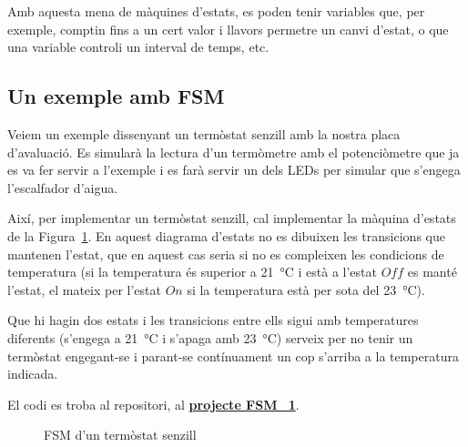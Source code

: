 Amb aquesta mena de màquines d'estats, es poden tenir variables que, per exemple, comptin fins a un cert valor i llavors permetre un canvi d'estat, o que una variable controli un interval de temps, etc. 

\subsection{Un exemple amb FSM}
\label{sub:fsm_example}

Veiem un exemple dissenyant un termòstat senzill amb la nostra placa d'avaluació. Es simularà la lectura d'un termòmetre amb el potenciòmetre que ja es va fer servir a l'exemple  i es farà servir un dels LEDs per simular que s'engega l'escalfador d'aigua.

Així, per implementar un termòstat senzill, cal implementar la màquina d'estats de la Figura~\ref{fig:FSM_THERMO}. En aquest diagrama d'estats no es dibuixen les transicions que mantenen l'estat, que en aquest cas seria si no es compleixen les condicions de temperatura (si la temperatura és superior a \si{21 \degreeCelsius} i està a l'estat $Off$ es manté l'estat, el mateix per l'estat $On$ si la temperatura està per sota del \si{23 \degreeCelsius}).

\begin{remark}
 Que hi hagin dos estats i les transicions entre ells sigui amb temperatures diferents (s'engega a \si{21 \degreeCelsius} i s'apaga amb \si{23 \degreeCelsius}) serveix per no tenir un termòstat engegant-se i parant-se contínuament un cop s'arriba a la temperatura indicada.
\end{remark}

El codi es troba al repositori, al \href{https://github.com/mariusmm/cursembedded/tree/master/Simplicity/FSM_1}{\bf projecte FSM\_1}.

\begin{figure}[h!]
\centering
 \caption{FSM d'un termòstat senzill}
 \label{fig:FSM_THERMO}
\end{figure}

